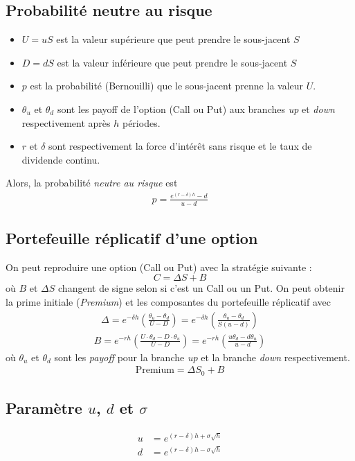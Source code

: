 \documentclass[10pt, french]{article}
\begin{document}
\begin{multicols*}{2}
\subsection*{Probabilité neutre au risque}
\begin{itemize}
\item $U = uS$ est la valeur supérieure que peut prendre le sous-jacent $S$
\item $D = dS$ est la valeur inférieure que peut prendre le sous-jacent $S$
\item $p$ est la probabilité (Bernouilli) que le sous-jacent prenne la valeur $U$.
\item $\theta_u$ et $\theta_d$ sont les payoff de l'option (Call ou Put) aux branches \emph{up} et \emph{down} respectivement après $h$ périodes.
\item $r$ et $\delta$ sont respectivement la force d'intérêt sans risque et le taux de dividende continu.
\end{itemize}
 Alors, la probabilité \textit{neutre au risque} est
\begin{align*}
p = \frac{e^{(r-\delta)h} - d}{u-d}
\end{align*}

\subsection*{Portefeuille réplicatif d'une option}
On peut reproduire une option (Call ou Put) avec la stratégie suivante  :
\[C = \Delta S + B\]
où $B$ et $\Delta S$ changent de signe selon si c'est un Call ou un Put. On peut obtenir la prime initiale (\textit{Premium}) et les composantes du portefeuille réplicatif avec
\begin{align*}
\Delta = e^{-\delta h} \left( \frac{\theta_u - \theta_d}{U - D} \right) =   e^{-\delta h} \left( \frac{\theta_u - \theta_d}{S(u -d)} \right)
\end{align*}
\begin{align*}
B = e^{-rh} \left( \frac{U \cdot \theta_d - D \cdot \theta_u}{U - D} \right) = e^{-rh} \left( \frac{u \theta_d - d \theta_u}{u-d} \right)
\end{align*}
où $\theta_u$ et $\theta_d$ sont les \emph{payoff} pour la branche \emph{up} et la branche \emph{down} respectivement.
\begin{align*}
\text{Premium} = \Delta S_0 + B
\end{align*}


\subsection*{Paramètre $u$, $d$ et $\sigma$}
\begin{align*}
	u & = e^{(r-\delta)h + \sigma \sqrt{h}} \\
	d & = e^{(r-\delta)h - \sigma \sqrt{h}} \\
\end{align*}


\end{multicols*}
\end{document}
